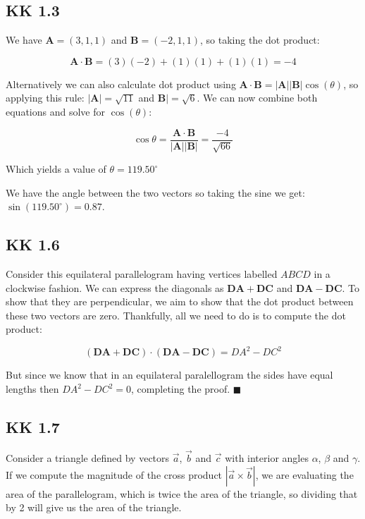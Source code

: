 \documentclass{article}
\theoremstyle{definition}
\numberwithin{equation}{section}
\numberwithin{definition}{section}
\begin{document}
\subsection{KK 1.3}

We have $\mathbf{A} = (3, 1, 1)$ and $\mathbf{B} = (-2, 1, 1)$, so taking the dot product:

\[\mathbf{A} \cdot \mathbf{B} = (3)(-2) + (1)(1) + (1)(1) = -4\]

Alternatively we can also calculate dot product using $\mathbf{A} \cdot \mathbf{B} = |\mathbf{A}||\mathbf{B}| \cos(\theta)$, so applying this rule: $|\mathbf{A}| = \sqrt{11}$ and $\mathbf{B}| = \sqrt{6}$. We can now combine both equations and solve for $\cos(\theta)$:

\[ \cos{\theta} = \frac{\mathbf A \cdot \mathbf B}{|\mathbf A| |\mathbf B|} = \frac{-4}{\sqrt{66}}\]

Which yields a value of $\theta = 119.50^\circ$

\medskip

We have the angle between the two vectors so taking the sine we get: $\sin(119.50^\circ) = 0.87$. 



\subsection{KK 1.6}

Consider this equilateral parallelogram having vertices labelled $ABCD$ in a clockwise fashion. We can express the diagonals as $\mathbf{DA} + \mathbf{DC}$ and $\mathbf{DA} - \mathbf{DC}$. To show that they are perpendicular, we aim to show that the dot product between these two vectors are zero. Thankfully, all we need to do is to compute the dot product:

\[ (\mathbf{DA} + \mathbf{DC})\cdot (\mathbf{DA} - \mathbf{DC}) =DA^2 - DC^2\]

But since we know that in an equilateral paralellogram the sides have equal lengths then $DA^2  - DC^2 = 0$, completing the proof. $\blacksquare$

\subsection{KK 1.7}

Consider a triangle defined by vectors $\vec{a}$, $\vec{b}$ and $\vec{c}$ with interior angles $\alpha$, $\beta$ and $\gamma$. If we compute the magnitude of the cross product $|\vec{a} \times \vec{b}|$, we are evaluating the area of the parallelogram, which is twice the area of the triangle, so dividing that by 2 will give us the area of the triangle. 
\end{document}
